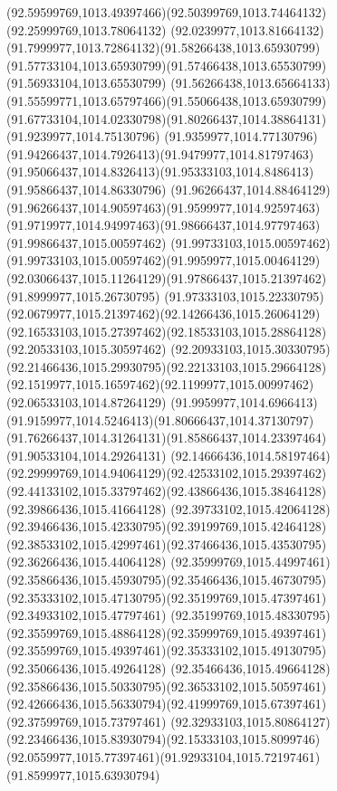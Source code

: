{{  \curveto(92.59599769,1013.49397466)(92.50399769,1013.74464132)(92.25999769,1013.78064132)
  \curveto(92.0239977,1013.81664132)(91.7999977,1013.72864132)(91.58266438,1013.65930799)
  \curveto(91.57733104,1013.65930799)(91.57466438,1013.65530799)(91.56933104,1013.65530799)
  \curveto(91.56266438,1013.65664133)(91.55599771,1013.65797466)(91.55066438,1013.65930799)
  \curveto(91.67733104,1014.02330798)(91.80266437,1014.38864131)(91.9239977,1014.75130796)
  \curveto(91.9359977,1014.77130796)(91.94266437,1014.7926413)(91.9479977,1014.81797463)
  \curveto(91.95066437,1014.8326413)(91.95333103,1014.8486413)(91.95866437,1014.86330796)
  \curveto(91.96266437,1014.88464129)(91.96266437,1014.90597463)(91.9599977,1014.92597463)
  \curveto(91.9719977,1014.94997463)(91.98666437,1014.97797463)(91.99866437,1015.00597462)
  \curveto(91.99733103,1015.00597462)(91.99733103,1015.00597462)(91.9959977,1015.00464129)
  \curveto(92.03066437,1015.11264129)(91.97866437,1015.21397462)(91.8999977,1015.26730795)
  \curveto(91.97333103,1015.22330795)(92.0679977,1015.21397462)(92.14266436,1015.26064129)
  \curveto(92.16533103,1015.27397462)(92.18533103,1015.28864128)(92.20533103,1015.30597462)
  \curveto(92.20933103,1015.30330795)(92.21466436,1015.29930795)(92.22133103,1015.29664128)
  \curveto(92.1519977,1015.16597462)(92.1199977,1015.00997462)(92.06533103,1014.87264129)
  \curveto(91.9959977,1014.6966413)(91.9159977,1014.5246413)(91.80666437,1014.37130797)
  \curveto(91.76266437,1014.31264131)(91.85866437,1014.23397464)(91.90533104,1014.29264131)
  \curveto(92.14666436,1014.58197464)(92.29999769,1014.94064129)(92.42533102,1015.29397462)
  \curveto(92.44133102,1015.33797462)(92.43866436,1015.38464128)(92.39866436,1015.41664128)
  \curveto(92.39733102,1015.42064128)(92.39466436,1015.42330795)(92.39199769,1015.42464128)
  \curveto(92.38533102,1015.42997461)(92.37466436,1015.43530795)(92.36266436,1015.44064128)
  \curveto(92.35999769,1015.44997461)(92.35866436,1015.45930795)(92.35466436,1015.46730795)
  \curveto(92.35333102,1015.47130795)(92.35199769,1015.47397461)(92.34933102,1015.47797461)
  \curveto(92.35199769,1015.48330795)(92.35599769,1015.48864128)(92.35999769,1015.49397461)
  \curveto(92.35599769,1015.49397461)(92.35333102,1015.49130795)(92.35066436,1015.49264128)
  \curveto(92.35466436,1015.49664128)(92.35866436,1015.50330795)(92.36533102,1015.50597461)
  \curveto(92.42666436,1015.56330794)(92.41999769,1015.67397461)(92.37599769,1015.73797461)
  \curveto(92.32933103,1015.80864127)(92.23466436,1015.83930794)(92.15333103,1015.8099746)
  \curveto(92.0559977,1015.77397461)(91.92933104,1015.72197461)(91.8599977,1015.63930794)
}}
